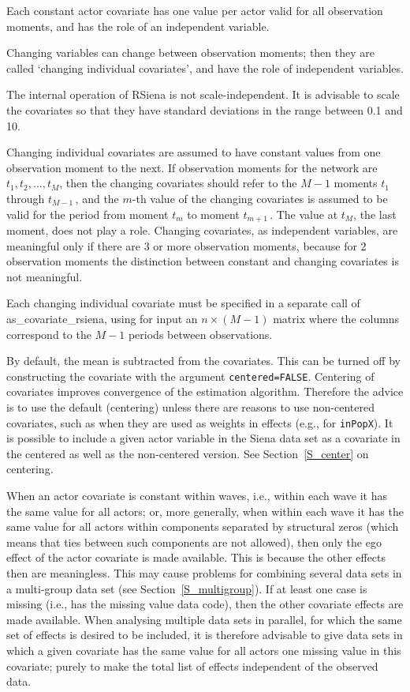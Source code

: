 \documentclass[a4paper,fleqn,11pt]{article}
\newcommand{\+}{\, + \,}
\newcommand{\sfn}[1]{\textsf{#1}}
\newcommand{\RS}{{\sf \textsf{RSiena} }}
\begin{document}
Each constant actor covariate has one value per actor
valid for all observation moments, and has the role of an
independent variable.

Changing variables can change between observation moments;
then they are called `changing individual covariates',
and have the role of independent variables.

The internal operation of \RS is not scale-independent.
It is advisable to scale the covariates so that they have
standard deviations in the range between 0.1 and 10.

Changing individual covariates are assumed to have constant values from one
observation moment to the next. If observation moments for the
network are $t_1, t_2, ..., t_M$, then the changing covariates
should refer to the $M-1$ moments $t_1$ through $t_{M-1}\,$, and
the $m$-th value of the changing covariates is assumed to be valid
for the period from moment $t_m$ to moment $t_{m+1}\,$.
The value at $t_M$, the last moment, does not play a role.
Changing covariates, as independent variables, are meaningful
only if there are 3 or more observation moments,
because for 2 observation moments the distinction between
constant and changing covariates is not meaningful.

Each changing individual covariate must be specified
in a separate call of \sfn{as\_covariate\_rsiena}, using for input
an $n \times (M-1)$ matrix where the columns correspond to the $M-1$ periods
between observations.

By default, the mean is subtracted from the covariates.
This can be turned off by constructing the covariate with the argument
\texttt{centered=FALSE}. Centering of covariates improves
convergence of the estimation algorithm.
Therefore the advice is to use the default (centering) unless there are reasons to
use non-centered covariates, such as when they are used as weights in effects
(e.g., for \texttt{inPopX}).
It is possible to include a given actor variable in the Siena data set
as a covariate in the centered as well as the non-centered version.
See Section~\ref{S_center} on centering.

\iffalse
When an actor covariate is constant within waves, i.e.,
within each wave it has the same value for all actors;
or, more generally, when within each wave it has the same value for
all actors
within components separated by structural zeros (which means that
ties between such components are not allowed), then only the ego effect
of the actor covariate is made available.
This is because the other effects then are meaningless.
This may cause problems for combining several data sets
in a multi-group data set (see Section~\ref{S_multigroup}).
If at least one case is missing (i.e., has the missing value data code),
then the other covariate effects are made available.
When analysing multiple data sets in parallel,
for which the same set of effects is desired to be included,
it is therefore advisable to give data sets in which
a given covariate has the same value for all actors
one missing value in this covariate; purely to make
the total list of effects independent of the observed data.
\end{document}
